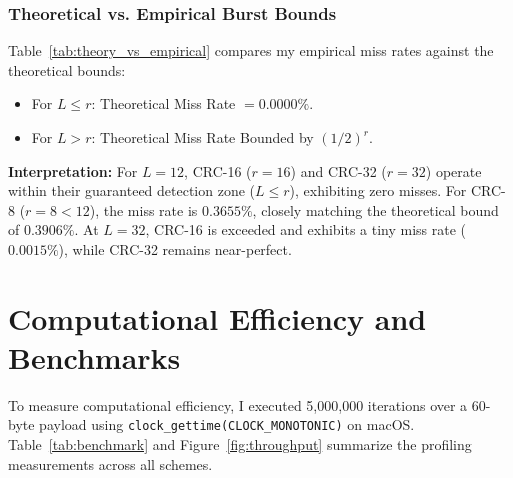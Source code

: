 \documentclass[12pt,a4paper]{article}
\begin{document}
\subsubsection{Theoretical vs. Empirical Burst Bounds}
Table~\ref{tab:theory_vs_empirical} compares my empirical miss rates against the theoretical bounds:
\begin{itemize}[leftmargin=*]
    \item For $L \le r$: Theoretical Miss Rate $= 0.0000\%$.
    \item For $L > r$: Theoretical Miss Rate Bounded by $(1/2)^r$.
\end{itemize}

\begin{table}[htbp]
\centering
\small
{}
\caption{Comparison of Empirical Miss Rates against the Mathematical $(1/2)^r$ Bound.}
\label{tab:theory_vs_empirical}
\end{table}

\noindent\textbf{Interpretation:} For $L=12$, CRC-16 ($r=16$) and CRC-32 ($r=32$) operate within their guaranteed detection zone ($L \le r$), exhibiting zero misses. For CRC-8 ($r=8 < 12$), the miss rate is $0.3655\%$, closely matching the theoretical bound of $0.3906\%$. At $L=32$, CRC-16 is exceeded and exhibits a tiny miss rate ($0.0015\%$), while CRC-32 remains near-perfect.


\section{Computational Efficiency and Benchmarks}

To measure computational efficiency, I executed 5,000,000 iterations over a 60-byte payload using \texttt{clock\_gettime(CLOCK\_MONOTONIC)} on macOS. Table~\ref{tab:benchmark} and Figure~\ref{fig:throughput} summarize the profiling measurements across all schemes.
\end{document}
